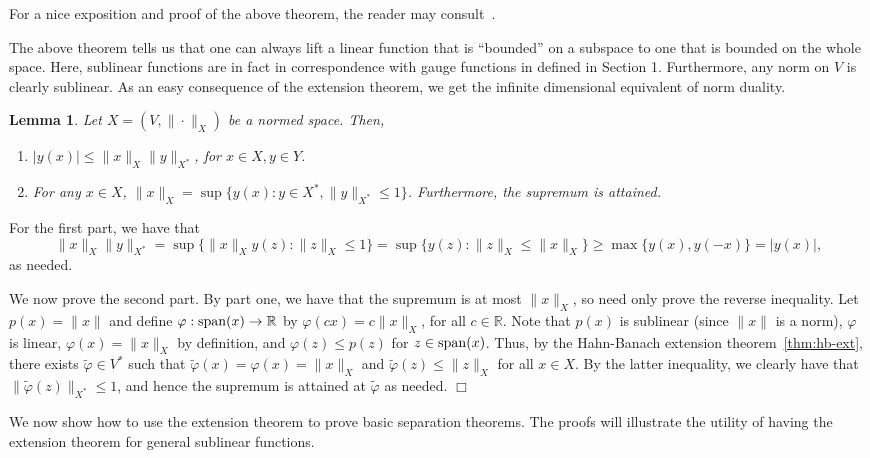 \documentclass[11pt]{article}
\newtheorem{lemma}[theorem]{Lemma}
\theoremstyle{plain}
\newenvironment{proof}{\noindent {\sc Proof:}}{$\Box$ \medskip}
\theoremstyle{plain}
\newcommand{\set}[1]{\{{#1}\}}
\newcommand{\R}{\ensuremath{\mathbb{R}}}
\begin{document}
For a nice exposition and proof of the above theorem, the reader may
consult~\cite{Peng2014}.

The above theorem tells us that one can always lift a linear function that is
``bounded'' on a subspace to one that is bounded on the whole space.  Here,
sublinear functions are in fact in correspondence with gauge functions in
defined in Section 1. Furthermore, any norm on $V$ is clearly sublinear. As an
easy consequence of the extension theorem, we get the infinite dimensional
equivalent of norm duality.

\begin{lemma} Let $X = (V,\|\cdot\|_X)$ be a normed space. Then,
\begin{enumerate}
\item $|y(x)| \leq \|x\|_X\|y\|_{X^*}$, for $x \in X, y \in Y$.
\item For any $x \in X$, $\|x\|_X = \sup \set{y(x): y \in X^*, \|y\|_{X^*} \leq 1}$.
Furthermore, the supremum is attained.
\end{enumerate}
\label{lem:nd-inf}
\end{lemma}  
\begin{proof}
For the first part, we have that 
\[
\|x\|_X\|y\|_{X^*} = \sup \set{\|x\|_X y(z): \|z\|_X \leq 1} = \sup \set{y(z):
\|z\|_X \leq \|x\|_X} \geq \max \set{y(x),y(-x)} = |y(x)| ,
\]
as needed. 

We now prove the second part. By part one, we have that the supremum is at most
$\|x\|_X$, so need only prove the reverse inequality. Let $p(x) = \|x\|$ and
define $\varphi: {\rm span}(x) \rightarrow \R$ by $\varphi(c x) = c \|x\|_X$, for all
$c \in \R$. Note that $p(x)$ is sublinear (since $\|x\|$ is a norm), $\varphi$ is
linear, $\varphi(x) = \|x\|_X$ by definition, and $\varphi(z) \leq p(z)$ for $z \in
{\rm span}(x)$. Thus, by the Hahn-Banach extension theorem~\ref{thm:hb-ext},
there exists $\tilde{\varphi} \in V^*$ such that $\tilde{\varphi}(x) = \varphi(x) =
\|x\|_X$ and $\tilde{\varphi}(z) \leq \|z\|_X$ for all $x \in X$. By the latter
inequality, we clearly have that $\|\tilde{\varphi}(z)\|_{X^*} \leq 1$, and hence
the supremum is attained at $\tilde{\varphi}$ as needed.
\end{proof}

We now show how to use the extension theorem to prove basic separation theorems.
The proofs will illustrate the utility of having the extension theorem for
general sublinear functions.
\end{document}
